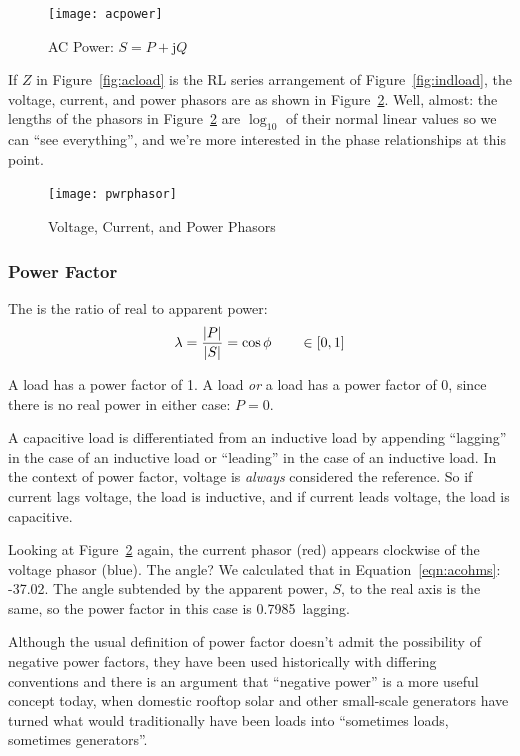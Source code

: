 \documentclass[11pt]{article}
\newcommand*\gArgZ{-37.02\deg\xspace}
\newcommand*\gPF{0.7985~lagging\xspace}
\begin{document}
\begin{figure}[ht]
  \centering
  \texttt{[image: acpower]}
  \caption{AC Power: $S=P+\mathrm{j}Q$}
  \label{fig:acpower}
\end{figure}


If $Z$ in Figure~\ref{fig:acload} is the RL series arrangement of
Figure~\ref{fig:indload}, the voltage, current, and power phasors are
as shown in Figure~\ref{fig:pwrphasor}. Well, almost: the lengths of
the phasors in Figure~\ref{fig:pwrphasor} are $\log_{10}$ of their
normal linear values so we can ``see everything'', and we're more
interested in the phase relationships at this point.

\begin{figure}[ht]
  \centering
  \texttt{[image: pwrphasor]}
  \caption{Voltage, Current, and Power Phasors}
  \label{fig:pwrphasor}
\end{figure}


\subsubsection{Power Factor}

The  is the ratio of real to apparent power:
\[
\lambda = \frac{\lvert P\rvert}{\lvert S\rvert} = \cos\phi \qquad \in [0,1]
\]

A  load has a power factor of 1. A  load \emph{or} a  load has a
power factor of 0, since there is no real power in either case: $P=0$.

A capacitive load is differentiated from an inductive load by
appending ``lagging'' in the case of an inductive load or ``leading''
in the case of an inductive load. In the context of power factor,
voltage is \emph{always} considered the reference. So if current lags
voltage, the load is inductive, and if current leads voltage, the load
is capacitive.

Looking at Figure~\ref{fig:pwrphasor} again, the current phasor (red)
appears clockwise of the voltage phasor (blue). The angle? We
calculated that in Equation~\ref{eqn:acohms}: \gArgZ. The angle
subtended by the apparent power, $S$, to the real axis is the same, so
the power factor in this case is \gPF.

Although the usual definition of power factor doesn't admit the
possibility of negative power factors, they have been used
historically with differing conventions and there is an argument that
``negative power'' is a more useful concept today, when domestic
rooftop solar and other small-scale generators have turned what would
traditionally have been loads into ``sometimes loads, sometimes
generators''.
\end{document}
